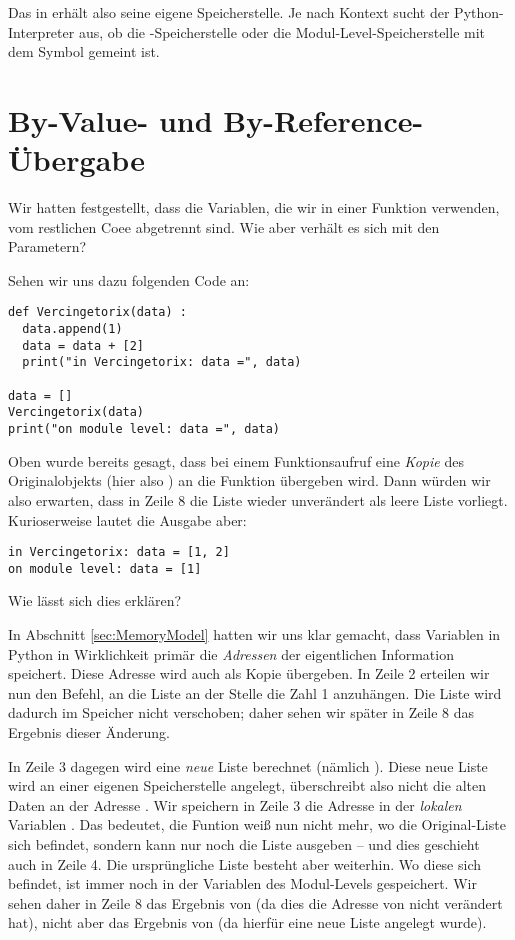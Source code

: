 Das  in  erhält also seine eigene Speicherstelle. Je nach Kontext sucht der Python-Interpreter aus, ob die -Speicherstelle oder die Modul-Level-Speicherstelle mit dem Symbol  gemeint ist.

\section{By-Value- und By-Reference-Übergabe}
Wir hatten festgestellt, dass die Variablen, die wir in einer Funktion verwenden, vom restlichen Coee abgetrennt sind. Wie aber verhält es sich mit den Parametern?

Sehen wir uns dazu folgenden Code an:
\begin{codebox}
\begin{verbatim}
def Vercingetorix(data) :
  data.append(1)
  data = data + [2]
  print("in Vercingetorix: data =", data)

data = []
Vercingetorix(data)
print("on module level: data =", data)
\end{verbatim}
\end{codebox}
Oben wurde bereits gesagt, dass bei einem Funktionsaufruf eine \emph{Kopie} des Originalobjekts (hier also ) an die Funktion übergeben wird. Dann würden wir also erwarten, dass in Zeile 8 die Liste  wieder unverändert als leere Liste vorliegt. Kurioserweise lautet die Ausgabe aber:

\begin{cmdbox}
\begin{verbatim}
in Vercingetorix: data = [1, 2]
on module level: data = [1]
\end{verbatim}
\end{cmdbox}

Wie lässt sich dies erklären?

In Abschnitt \ref{sec:MemoryModel} hatten wir uns klar gemacht, dass Variablen in Python in Wirklichkeit primär die \emph{Adressen} der eigentlichen Information speichert. Diese Adresse wird auch als Kopie übergeben. In Zeile 2 erteilen wir nun den Befehl, an die Liste an der Stelle  die Zahl 1 anzuhängen. Die Liste wird dadurch im Speicher nicht verschoben; daher sehen wir später in Zeile 8 das Ergebnis dieser Änderung.

In Zeile 3 dagegen wird eine \emph{neue} Liste berechnet (nämlich \inPy{[1, 2]}). Diese neue Liste wird an einer eigenen Speicherstelle angelegt, überschreibt also nicht die alten Daten an der Adresse . Wir speichern in Zeile 3 die Adresse in der \emph{lokalen} Variablen . Das bedeutet, die Funtion  weiß nun nicht mehr, wo die Original-Liste sich befindet, sondern kann nur noch die Liste \inPy{[1 ,2]} ausgeben -- und dies geschieht auch in Zeile 4. Die ursprüngliche Liste besteht aber weiterhin. Wo diese sich befindet, ist immer noch in der Variablen  des Modul-Levels gespeichert. Wir sehen daher in Zeile 8 das Ergebnis von  (da dies die Adresse von  nicht verändert hat), nicht aber das Ergebnis von  (da hierfür eine neue Liste angelegt wurde).

